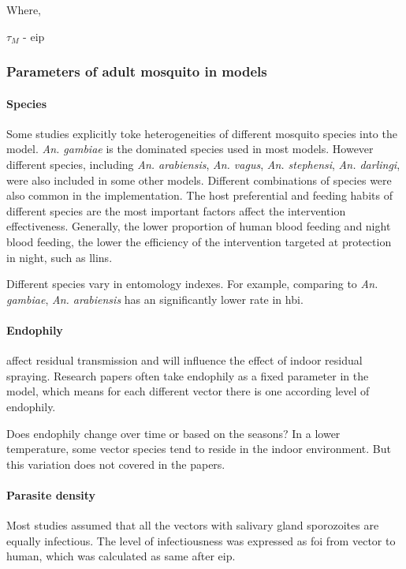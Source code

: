 \documentclass[a4paper, 12pt, twoside]{article}
\begin{document}
Where,
\begin{centering}
  $\tau_M$ - \gls{eip} \\
\end{centering}

\subsubsection{Parameters of adult mosquito in models}
\paragraph{Species}%
\label{par:species}
Some studies explicitly toke heterogeneities of different mosquito species into the model.
\textit{An. gambiae} is the dominated species used in most models.
However different species, including \textit{An. arabiensis}, \textit{An. vagus}, \textit{An. stephensi}, \textit{An. darlingi}, were also included in some other models.
Different combinations of species were also common in the implementation.
The host preferential and feeding habits of different species are the most important factors affect the intervention effectiveness.
Generally, the lower proportion of human blood feeding and night blood feeding, the lower the efficiency of the intervention targeted at protection in night, such as \gls{llins}.

Different species vary in entomology indexes.
For example, comparing to \textit{An. gambiae}, \textit{An. arabiensis} has an significantly lower rate in \gls{hbi}.

\paragraph{Endophily}%
\label{par:endophily}
affect residual transmission and will influence the effect of indoor residual spraying.
Research papers often take endophily as a fixed parameter in the model, which means for each different vector there is one according level of endophily.

Does endophily change over time or based on the seasons?
In a lower temperature,  some vector species tend to reside in the indoor environment.
But this variation does not covered in the papers.

\paragraph{Parasite density}%
\label{par:parasite_density}
Most studies assumed that all the vectors with salivary gland sporozoites are equally infectious.
The level of infectiousness was expressed as \gls{foi} from vector to human, which was calculated as same after \gls{eip}.
\end{document}
